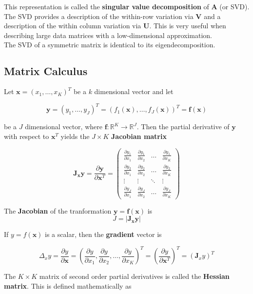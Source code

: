 \documentclass[11pt]{article}
\theoremstyle{definition}
\begin{document}
This representation is called the \textbf{singular value decomposition} of $\mathbf{A}$ (or SVD).  The SVD provides a description of the within-row variation via $\mathbf{V}$ and a description of the within column variation via $\mathbf{U}$.  This is very useful when describing large data matrices with a low-dimensional approximation.\\

The SVD of a symmetric matrix is identical to its eigendecomposition.

\subsection{Matrix Calculus}
Let $\mathbf{x} = (x_1, \hdots, x_K)^T$ be a $k$ dimensional vector and let 

\[\mathbf{y} = (y_1, \hdots, y_J)^T = (f_1(\mathbf{x}), \hdots, f_J(\mathbf{x}))^T = \mathbf{f}(\mathbf{x})\]

be a $J$ dimensional vector, where $\mathbf{f}: \mathbb{R}^K \rightarrow \mathbb{R}^J$.  Then the partial derivative of $\mathbf{y}$ with respect to $\mathbf{x}^T$ yields the $J \times K$ \textbf{Jacobian matrix}

\[\mathbf{J_xy} = \frac{\partial \mathbf{y}}{\partial \mathbf{x}^T} 
=
\begin{pmatrix}
    \frac{\partial y_1}{\partial x_1} & \frac{\partial y_1}{\partial x_2} & \dots  & \frac{\partial y_1}{\partial x_K} \\
    \frac{\partial y_2}{\partial x_1} & \frac{\partial y_2}{\partial x_2} & \dots  & \frac{\partial y_2}{\partial x_K}\\
    \vdots & \vdots  & \ddots & \vdots \\
    \frac{\partial y_J}{\partial x_1} & \frac{\partial y_J}{\partial x_2} & \dots  & \frac{\partial y_J}{\partial x_K}
\end{pmatrix}
\]

The \textbf{Jacobian} of the tranformation $\mathbf{y} = \mathbf{f(x)}$ is 
$$J = |\mathbf{J_xy}|$$

If $y = f(\mathbf{x})$ is a scalar, then the \textbf{gradient} vector is

$$\Delta_xy = \frac{\partial y}{\partial \mathbf{x}} = \left(\frac{\partial y}{\partial x_1}, \frac{\partial y}{\partial x_2}, \hdots, \frac{\partial y}{\partial x_K} \right)^T = \left(\frac{\partial y}{\partial \mathbf{x}^T}\right)^T = (\mathbf{J}_xy)^T$$

The $K \times K$ matrix of second order partial derivatives is called the \textbf{Hessian matrix}.  This is defined mathematically as
\end{document}
